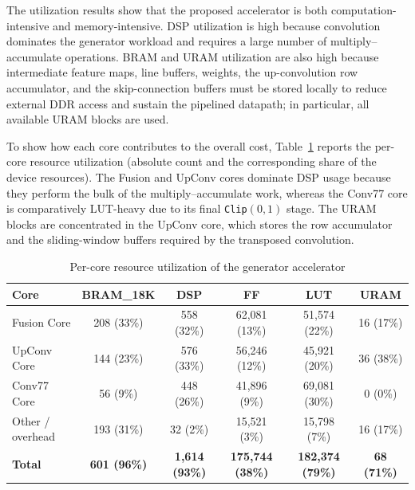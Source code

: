 The utilization results show that the proposed accelerator is both computation-intensive and memory-intensive. DSP utilization is high because convolution dominates the generator workload and requires a large number of multiply--accumulate operations. BRAM and URAM utilization are also high because intermediate feature maps, line buffers, weights, the up-convolution row accumulator, and the skip-connection buffers must be stored locally to reduce external DDR access and sustain the pipelined datapath; in particular, all available URAM blocks are used.

To show how each core contributes to the overall cost, Table~\ref{tab:resource_breakdown} reports the per-core resource utilization (absolute count and the corresponding share of the device resources). The Fusion and UpConv cores dominate DSP usage because they perform the bulk of the multiply--accumulate work, whereas the Conv77 core is comparatively LUT-heavy due to its final \texttt{Clip}$(0,1)$ stage. The URAM blocks are concentrated in the UpConv core, which stores the row accumulator and the sliding-window buffers required by the transposed convolution.

\begin{table}[H]
    \centering
    \caption{Per-core resource utilization of the generator accelerator}
    \label{tab:resource_breakdown}
    \small
    \setlength{\tabcolsep}{4pt}
    \renewcommand{\arraystretch}{1.2}
    \begin{tabular}{|l|c|c|c|c|c|}
        \hline
        \textbf{Core} & \textbf{BRAM\_18K} & \textbf{DSP} & \textbf{FF} & \textbf{LUT} & \textbf{URAM} \\
        \hline
        Fusion Core & 208 (33\%) & 558 (32\%) & 62,081 (13\%) & 51,574 (22\%) & 16 (17\%) \\
        \hline
        UpConv Core & 144 (23\%) & 576 (33\%) & 56,246 (12\%) & 45,921 (20\%) & 36 (38\%) \\
        \hline
        Conv77 Core & 56 (9\%) & 448 (26\%) & 41,896 (9\%) & 69,081 (30\%) & 0 (0\%) \\
        \hline
        Other / overhead & 193 (31\%) & 32 (2\%) & 15,521 (3\%) & 15,798 (7\%) & 16 (17\%) \\
        \hline
        \textbf{Total} & \textbf{601 (96\%)} & \textbf{1,614 (93\%)} & \textbf{175,744 (38\%)} & \textbf{182,374 (79\%)} & \textbf{68 (71\%)} \\
        \hline
    \end{tabular}
\end{table}

